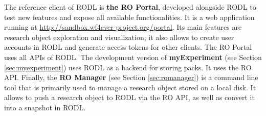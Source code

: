 The reference client of RODL is \textbf{the RO Portal}, developed alongside RODL to test new features and expose all available functionalities. It is a web application running at \url{http://sandbox.wf4ever-project.org/portal}. Its main features are research object exploration and visualization; it also allows to create user accounts in RODL and generate access tokens for other clients. The RO Portal uses all APIs of RODL. %
The development version of \textbf{myExperiment} (see Section \ref{sec:myexperiment})%
uses RODL as a backend for storing packs. It uses the RO API. Finally, the \textbf{RO Manager} (see Section \ref{sec:romanager}) %
is a command line tool that is primarily used to manage a research object stored on a local disk. It allows to push a research object to RODL via the RO API, as well as convert it into a snapshot in RODL.

